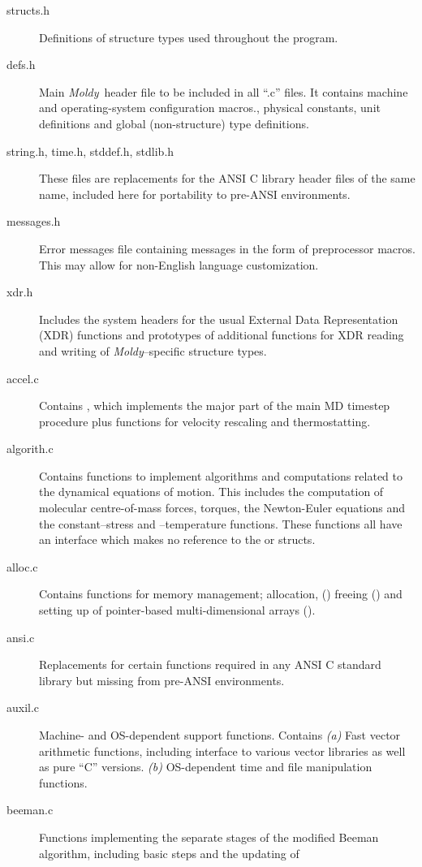 \documentclass[a4paper,twoside]{report}
\newcommand{\Fname}[1]{{\upshape\mdseries\sffamily#1}}
\newenvironment{Fndescription}{\begingroup%
     \renewcommand{\descriptionlabel}[1]{\Fname{##1}}\begin{description}}%
     {\end{description}\endgroup}
\newcommand{\moldy}{\emph{Moldy}}
\begin{document}
\begin{Fndescription}
\item[structs.h] Definitions of structure types used throughout the
  program.
\item[defs.h] Main \moldy\ header file to be included in all
  ``\Fname{.c}'' files.  It contains machine and operating-system
  configuration macros., physical constants, unit definitions and
  global (non-structure) type definitions.
\item[string.h, time.h, stddef.h, stdlib.h] These files are
  replacements for the ANSI C library header files of the same name,
  included here for portability to pre-ANSI environments.
\item[messages.h] Error messages file containing messages in the form
  of preprocessor macros. This may allow for non-English language
  customization. 
\item[xdr.h] Includes the system headers for the usual External Data
  Representation (XDR) functions and prototypes of additional
  functions for XDR reading and writing of \moldy--specific structure
  types.
\item[accel.c] Contains , which implements the
  major part of the main MD timestep procedure plus functions for
  velocity rescaling and thermostatting.
\item[algorith.c] Contains functions to implement algorithms and
  computations related to the dynamical equations of motion. This
  includes the computation of molecular centre-of-mass forces,
  torques, the Newton-Euler equations and the constant--stress and
  --temperature functions.  These functions all have an
  interface which makes no reference to the  or
   structs.
\item[alloc.c] Contains functions for memory management; allocation,
  () freeing () and setting up of
  pointer-based multi-dimensional arrays ().
\item[ansi.c] Replacements for certain functions required in any ANSI
  C standard library but missing from pre-ANSI environments.
\item[auxil.c] Machine- and OS-dependent support functions. Contains
  \emph{(a)} Fast vector arithmetic functions, including interface to
  various vector libraries as well as pure ``C'' versions. \emph{(b)}
  OS-dependent time and file manipulation functions.
\item[beeman.c] Functions implementing the separate stages of the
  modified Beeman algorithm, including basic steps and the updating of

\end{Fndescription}
\end{document}
